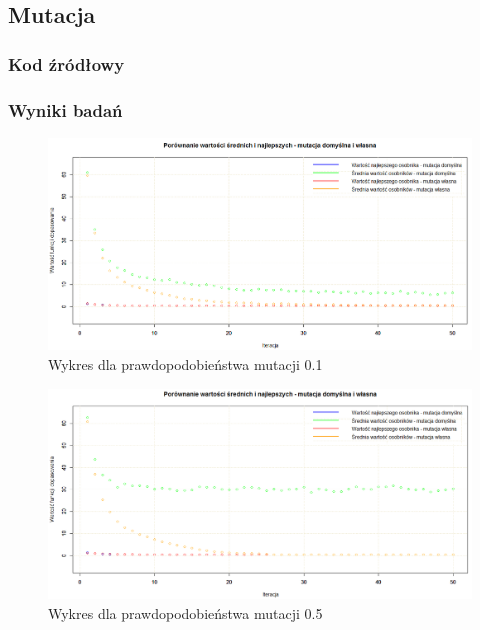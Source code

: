 \subsection{Mutacja}

\subsubsection{Kod źródłowy}



\subsubsection{Wyniki badań}

\begin{figure}[H]
	\centering
	\hspace*{-0.8in}
	\includegraphics[scale = 0.5]{img/zad1/mut_0_1}
	\caption{Wykres dla prawdopodobieństwa mutacji 0.1}  
	\label{rys:mut_0.1} 
\end{figure}

\begin{figure}[H]
	\centering
	\hspace*{-0.8in}
	\includegraphics[scale = 0.5]{img/zad1/mut_0_5}
	\caption{Wykres dla prawdopodobieństwa mutacji 0.5}  
	\label{rys:mut_0.5} 
\end{figure}


